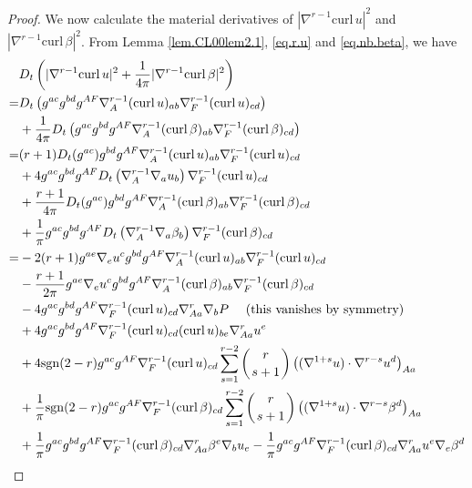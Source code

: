 \documentclass[12pt,reqno]{amsart}
\numberwithin{equation}{section}
\theoremstyle{definition}
\theoremstyle{remark}
\begin{document}
\begin{proof}
 We now calculate the material derivatives of $|{\nabla}^{r-1}{\mathrm{curl}\,} u|^2$ and $|{\nabla}^{r-1}{\mathrm{curl}\,} \beta|^2$. From Lemma \ref{lem.CL00lem2.1}, \eqref{eq.r.u} and \eqref{eq.nb.beta}, we have
\begin{align*}
  &D_t\left(|{\nabla}^{r-1}{\mathrm{curl}\,} u|^2+\frac{1}{4\pi}|{\nabla}^{r-1}{\mathrm{curl}\,} \beta|^2\right)\\
  =&D_t\left(g^{ac}g^{bd}g^{AF}{\nabla}_A^{r-1}({\mathrm{curl}\,} u)_{ab} {\nabla}_F^{r-1}({\mathrm{curl}\,} u)_{cd}\right)\\
  &+\frac{1}{4\pi}D_t\left(g^{ac}g^{bd}g^{AF}{\nabla}_A^{r-1}({\mathrm{curl}\,} \beta)_{ab} {\nabla}_F^{r-1}({\mathrm{curl}\,} \beta)_{cd}\right)\\
  =&(r+1)D_t(g^{ac})g^{bd}g^{AF}{\nabla}_A^{r-1}({\mathrm{curl}\,} u)_{ab} {\nabla}_F^{r-1}({\mathrm{curl}\,} u)_{cd}\\
   &+4 g^{ac}g^{bd}g^{AF}D_t\left({\nabla}_A^{r-1}{\nabla}_a u_b\right) {\nabla}_F^{r-1}({\mathrm{curl}\,} u)_{cd}\\
   &+\frac{r+1}{4\pi}D_t(g^{ac})g^{bd}g^{AF}{\nabla}_A^{r-1}({\mathrm{curl}\,} \beta)_{ab} {\nabla}_F^{r-1}({\mathrm{curl}\,} \beta)_{cd}\\
   &+\frac{1}{\pi} g^{ac}g^{bd}g^{AF}D_t\left({\nabla}_A^{r-1}{\nabla}_a \beta_b\right) {\nabla}_F^{r-1}({\mathrm{curl}\,} \beta)_{cd}\\
  =&-2(r+1)g^{ae}{\nabla}_e u^cg^{bd}g^{AF}{\nabla}_A^{r-1}({\mathrm{curl}\,} u)_{ab} {\nabla}_F^{r-1}({\mathrm{curl}\,} u)_{cd}\\
  &-\frac{r+1}{2\pi}g^{ae}{\nabla}_e u^cg^{bd}g^{AF}{\nabla}_A^{r-1}({\mathrm{curl}\,} \beta)_{ab} {\nabla}_F^{r-1}({\mathrm{curl}\,} \beta)_{cd}\\
  &-4 g^{ac}g^{bd}g^{AF}{\nabla}_F^{r-1}({\mathrm{curl}\,} u)_{cd}{\nabla}_{Aa}^r{\nabla}_b{P } \quad\text{ (this vanishes by symmetry)}\\
  &+ 4g^{ac}g^{bd}g^{AF}{\nabla}_F^{r-1}({\mathrm{curl}\,} u)_{cd}({\mathrm{curl}\,} u)_{be}{\nabla}_{Aa}^r u^e\\
  &+4{\mathrm{sgn}}(2-r)g^{ac}g^{AF}{\nabla}_F^{r-1}({\mathrm{curl}\,} u)_{cd}\sum_{s=1}^{r-2}\left(r\atop s+1\right)\left(({\nabla}^{1+s}u)\cdot{\nabla}^{r-s}u^d\right)_{Aa}\\
  &+\frac{1}{\pi}{\mathrm{sgn}}(2-r)g^{ac}g^{AF}{\nabla}_F^{r-1}({\mathrm{curl}\,} \beta)_{cd}\sum_{s=1}^{r-2}\left(r\atop s+1\right)\left(({\nabla}^{1+s}u)\cdot{\nabla}^{r-s}\beta^d\right)_{Aa}\\
&+\frac{1}{\pi} g^{ac}g^{bd}g^{AF}{\nabla}_F^{r-1}({\mathrm{curl}\,} \beta)_{cd}{\nabla}_{Aa}^r\beta^e{\nabla}_b u_e- \frac{1}{\pi}g^{ac}g^{AF}{\nabla}_F^{r-1}({\mathrm{curl}\,} \beta)_{cd}{\nabla}_{Aa}^r u^e{\nabla}_e\beta^d\\

\end{align*}
\end{proof}
\end{document}
